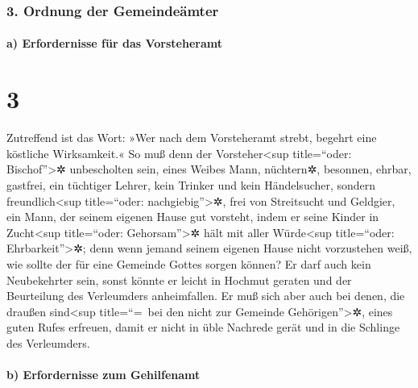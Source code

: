 \hypertarget{ordnung-der-gemeindeuxe4mter}{%
\subsubsection{3. Ordnung der
Gemeindeämter}\label{ordnung-der-gemeindeuxe4mter}}

\hypertarget{a-erfordernisse-fuxfcr-das-vorsteheramt}{%
\paragraph{a) Erfordernisse für das
Vorsteheramt}\label{a-erfordernisse-fuxfcr-das-vorsteheramt}}

\hypertarget{section-2}{%
\section{3}\label{section-2}}

 Zutreffend ist das Wort: »Wer nach dem Vorsteheramt
strebt, begehrt eine köstliche Wirksamkeit.«  So muß denn
der Vorsteher\textless sup title=``oder: Bischof''\textgreater✲
unbescholten sein, eines Weibes Mann, nüchtern✲, besonnen, ehrbar,
gastfrei, ein tüchtiger Lehrer,  kein Trinker und kein
Händelsucher, sondern freundlich\textless sup title=``oder:
nachgiebig''\textgreater✲, frei von Streitsucht und Geldgier,
 ein Mann, der seinem eigenen Hause gut vorsteht, indem er
seine Kinder in Zucht\textless sup title=``oder: Gehorsam''\textgreater✲
hält mit aller Würde\textless sup title=``oder:
Ehrbarkeit''\textgreater✲;  denn wenn jemand seinem
eigenen Hause nicht vorzustehen weiß, wie sollte der für eine Gemeinde
Gottes sorgen können?  Er darf auch kein Neubekehrter
sein, sonst könnte er leicht in Hochmut geraten und der Beurteilung des
Verleumders anheimfallen.  Er muß sich aber auch bei
denen, die draußen sind\textless sup title=``=~bei den nicht zur
Gemeinde Gehörigen''\textgreater✲, eines guten Rufes erfreuen, damit er
nicht in üble Nachrede gerät und in die Schlinge des Verleumders.

\hypertarget{b-erfordernisse-zum-gehilfenamt}{%
\paragraph{b) Erfordernisse zum
Gehilfenamt}\label{b-erfordernisse-zum-gehilfenamt}}

